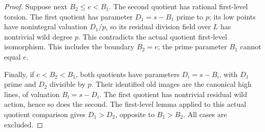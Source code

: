 \begin{proof}
Suppose next \(B_2\le e<B_1\). The second quotient has rational
first-level torsion. The first quotient has parameter
\(D_1=s-B_1\) prime to \(p\); its low points have nonintegral
valuation \(D_1/p\), so its residual division field over \(L\)
has nontrivial wild degree \(p\). This contradicts the actual
quotient first-level isomorphism. This includes the boundary
\(B_2=e\); the prime parameter \(B_1\) cannot equal \(e\).

Finally, if \(e<B_2<B_1\), both quotients have parameters
\(D_i=s-B_i\), with \(D_1\) prime and \(D_2\) divisible by
\(p\). Their identified old images are the canonical high lines,
of valuation \(B_i=s-D_i\). The first quotient has nontrivial
residual wild action, hence so does the second. The first-level
lemma applied to this actual quotient comparison gives
\(D_1>D_2\), opposite to \(B_1>B_2\). All cases are excluded.
\end{proof}

